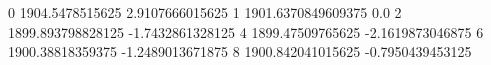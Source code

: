 0 1904.5478515625 2.9107666015625
1 1901.6370849609375 0.0
2 1899.893798828125 -1.7432861328125
4 1899.47509765625 -2.1619873046875
6 1900.38818359375 -1.2489013671875
8 1900.842041015625 -0.7950439453125
